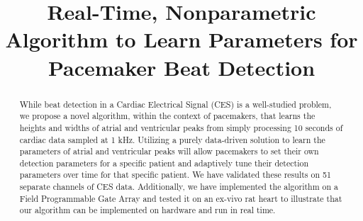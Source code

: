 \documentclass[conference]{IEEEtran}
\begin{document}
%
\title{Real-Time, Nonparametric Algorithm to Learn
Parameters for Pacemaker Beat Detection}


\author{
}







\maketitle

\begin{abstract}
While beat detection in a Cardiac Electrical 
Signal (CES) is a well-studied problem, we propose a novel
algorithm, within the context of pacemakers, that learns the
heights and widths of atrial and ventricular peaks from simply
processing 10 seconds of cardiac data sampled at 1 kHz. Utilizing
a purely data-driven solution to learn the parameters of atrial
and ventricular peaks will allow pacemakers to set their own
detection parameters for a specific patient and adaptively tune
their detection parameters over time for that specific patient.
We have validated these results on 51 separate channels of CES
data. Additionally, we have implemented the algorithm on a
Field Programmable Gate Array and tested it on an ex-vivo rat
heart to illustrate that our algorithm can be implemented on
hardware and run in real time.
\end{abstract}
\end{document}
